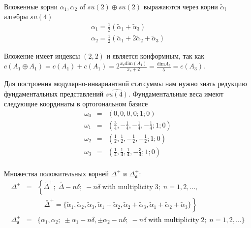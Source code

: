 \documentclass[a4paper,12pt]{article}
\theoremstyle{definition} \newtheorem{Def}{Definition}
\newcommand{\co}[1]{\overset{\circ }{#1}}
\begin{document}
Вложенные корни $\alpha_1,\alpha_2$ of $su(2)\oplus su(2)$
выражаются через корни $\tilde{\alpha}_i$ алгебры  $su(4)$
\begin{equation}
  \label{eq:37}
  \begin{array}{l}
     \alpha_1=\frac{1}{2}(\tilde{\alpha}_1+\tilde{\alpha}_3)\\
     \alpha_2=\frac{1}{2}(\tilde{\alpha}_1+2\tilde{\alpha}_2+\tilde{\alpha}_3)
  \end{array}
\end{equation}

Вложение имеет индексы  $(2,2)$ и является конформным, так как $c(A_1\oplus A_1)=c(A_1)+c(A_1)=2\frac{x_e \mathrm{dim}(A_1)}{x_e+2}=\frac{\mathrm{dim}A_3}{5}=c(A_3)$.

Для построения модулярно-инвариантной статсуммы нам нужно знать редукцию фундаментальных
представлений $\widehat{su(4)}$. Фундаментальные веса имеют следующие координаты в ортогональном базисе
\begin{equation}
  \begin{array}{lll}
     \omega_0 & = & (0,0,0,0;1;0)\\
     \omega_1 & = & (\frac{3}{4},-\frac{1}{4},-\frac{1}{4},-\frac{1}{4}; 1; 0)\\
     \omega_2 & = & (\frac{1}{2},\frac{1}{2},-\frac{1}{2},-\frac{1}{2}; 1; 0)\\
     \omega_3 & = & (\frac{1}{4},\frac{1}{4},\frac{1}{4},-\frac{3}{4}; 1; 0) \\
  \end{array}
\end{equation}


Множества положительных корней  $\Delta^{+}$ и $\Delta_{\mathfrak{a}}^{+}$:
\begin{equation}
  \label{eq:38}
  \begin{array}{lll}
    \Delta^{+} &=&\left\{\co{\Delta}^{+};\; \co{\Delta}-n\delta;\;     -n\delta\;\mbox{with multiplicity}\; 3;\; n=1,2,\dots,\right. \\
    & & \quad\left.\co{\Delta}^{+}=\{\tilde{\alpha}_1, \tilde{\alpha}_2, \tilde{\alpha}_3, \tilde{\alpha}_1+\tilde{\alpha}_2, \tilde{\alpha}_2+\tilde{\alpha}_3, \tilde{\alpha}_1+\tilde{\alpha}_2+\tilde{\alpha}_3\}\right\}\\
    \Delta_{\mathfrak{a}}^{+} &=& \{  \alpha_1,\alpha_2;\;\pm \alpha_1-n\delta,\pm \alpha_2-n\delta;\; -n\delta\; \mbox{with multiplicity} \; 2;\; n=1,2,\dots\}\\
  \end{array}
\end{equation}
\end{document}
